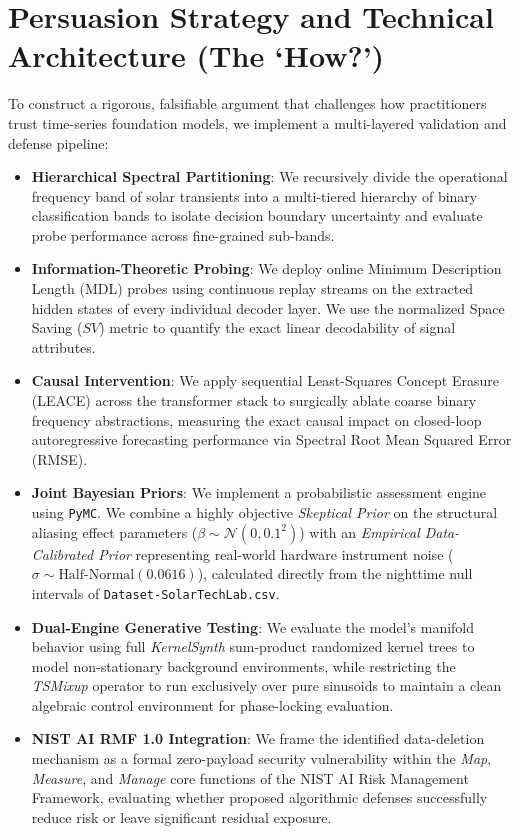 \documentclass[11pt,a4paper]{article}
\begin{document}
\section{Persuasion Strategy and Technical Architecture (The `How?')}
To construct a rigorous, falsifiable argument that challenges how practitioners trust time-series foundation models, we implement a multi-layered validation and defense pipeline:
\begin{itemize}
    \item \textbf{Hierarchical Spectral Partitioning}: We recursively divide the operational frequency band of solar transients into a multi-tiered hierarchy of binary classification bands to isolate decision boundary uncertainty and evaluate probe performance across fine-grained sub-bands.
    \item \textbf{Information-Theoretic Probing}: We deploy online Minimum Description Length (MDL) probes using continuous replay streams on the extracted hidden states of every individual decoder layer. We use the normalized Space Saving ($SV$) metric to quantify the exact linear decodability of signal attributes.
    \item \textbf{Causal Intervention}: We apply sequential Least-Squares Concept Erasure (LEACE) across the transformer stack to surgically ablate coarse binary frequency abstractions, measuring the exact causal impact on closed-loop autoregressive forecasting performance via Spectral Root Mean Squared Error (RMSE).
    \item \textbf{Joint Bayesian Priors}: We implement a probabilistic assessment engine using \texttt{PyMC}. We combine a highly objective \textit{Skeptical Prior} on the structural aliasing effect parameters ($\beta \sim \mathcal{N}(0, 0.1^2)$) with an \textit{Empirical Data-Calibrated Prior} representing real-world hardware instrument noise ($\sigma \sim \text{Half-Normal}(0.0616)$), calculated directly from the nighttime null intervals of \texttt{Dataset-SolarTechLab.csv}.
    \item \textbf{Dual-Engine Generative Testing}: We evaluate the model's manifold behavior using full \textit{KernelSynth} sum-product randomized kernel trees to model non-stationary background environments, while restricting the \textit{TSMixup} operator to run exclusively over pure sinusoids to maintain a clean algebraic control environment for phase-locking evaluation.
    \item \textbf{NIST AI RMF 1.0 Integration}: We frame the identified data-deletion mechanism as a formal zero-payload security vulnerability within the \textit{Map}, \textit{Measure}, and \textit{Manage} core functions of the NIST AI Risk Management Framework, evaluating whether proposed algorithmic defenses successfully reduce risk or leave significant residual exposure.
\end{itemize}
\end{document}
